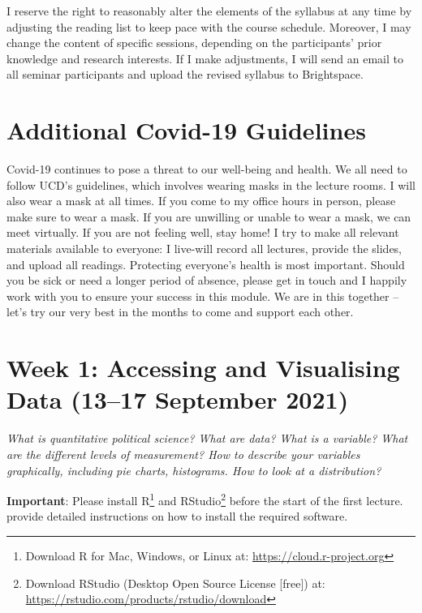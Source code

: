 \documentclass[abstract=on,parskip=full,headings=standardclasses,fontsize=11pt,paper=a4]{scrartcl}
\begin{document}
I reserve the right to reasonably alter the elements of the syllabus at any time by adjusting the reading list to keep pace with the course schedule. Moreover, I may change the content of specific sessions, depending on the participants' prior knowledge and research interests. If I make adjustments, I will send an email to all seminar participants and upload the revised syllabus to Brightspace.



\section*{Additional Covid-19 Guidelines}

Covid-19 continues to pose a threat to our well-being and health. We all need to follow UCD's guidelines, which involves wearing masks in the lecture rooms. I will also wear  a mask at all times. If you come to my office hours in person, please make sure to wear a mask. If you are unwilling or unable to wear a mask, we can meet virtually. If you are not feeling well, stay home! I try to make all relevant materials available to everyone: I live-will record all lectures, provide the slides, and upload all readings. Protecting everyone's health is most important. Should you be sick or need a longer period of absence, please get in touch  and I happily work with you to ensure your success in this module. We are in this together -- let's try our very best in the months to come and support each other.




\tableofcontents

\section{Week 1: Accessing and Visualising Data (13--17 September 2021)}


\textit{What is quantitative political science? What are data? What is a variable? What are the different levels of measurement? How to describe your variables graphically, including pie charts, histograms. How to look at a distribution?}

\textbf{Important}: Please install \textsf{R}\footnote{Download \textsf{R} for Mac, Windows, or Linux at: \url{https://cloud.r-project.org}} and \textsf{RStudio}\footnote{Download \textsf{RStudio} (Desktop Open Source License [free]) at: \url{https://rstudio.com/products/rstudio/download}} before the start of the first lecture.  \textcite[ch. 1]{ismay20} provide detailed instructions on how to install the required software.
\end{document}
